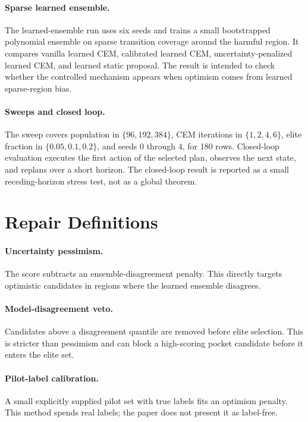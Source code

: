 \paragraph{Sparse learned ensemble.}
The learned-ensemble run uses six seeds and trains a small bootstrapped polynomial ensemble on sparse transition coverage around the harmful region. It compares vanilla learned CEM, calibrated learned CEM, uncertainty-penalized learned CEM, and learned static proposal. The result is intended to check whether the controlled mechanism appears when optimism comes from learned sparse-region bias.

\paragraph{Sweeps and closed loop.}
The sweep covers population in $\{96,192,384\}$, CEM iterations in $\{1,2,4,6\}$, elite fraction in $\{0.05,0.1,0.2\}$, and seeds $0$ through $4$, for 180 rows. Closed-loop evaluation executes the first action of the selected plan, observes the next state, and replans over a short horizon. The closed-loop result is reported as a small receding-horizon stress test, not as a global theorem.

\section{Repair Definitions}
\label{app:repairs}

\paragraph{Uncertainty pessimism.}
The score subtracts an ensemble-disagreement penalty. This directly targets optimistic candidates in regions where the learned ensemble disagrees.

\paragraph{Model-disagreement veto.}
Candidates above a disagreement quantile are removed before elite selection. This is stricter than pessimism and can block a high-scoring pocket candidate before it enters the elite set.

\paragraph{Pilot-label calibration.}
A small explicitly supplied pilot set with true labels fits an optimism penalty. This method spends real labels; the paper does not present it as label-free.

